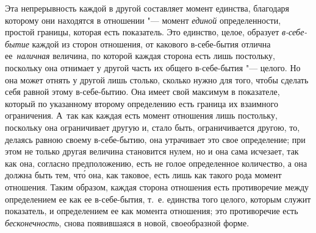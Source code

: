 Эта непрерывность каждой в другой составляет момент единства, благодаря
которому они находятся в отношении "--- момент {\em единой} определенности,
простой границы, которая есть показатель. Это единство, целое, образует
{\em в-себе-бытие} каждой из сторон отношения, от какового в-себе-бытия отлична
ее~{\em наличная} величина, по которой каждая сторона есть лишь постольку,
поскольку она отнимает у другой часть их общего в-себе-бытия "--- целого. Но
она может отнять у другой лишь столько, сколько нужно для того, чтобы сделать
себя равной этому в-себе-бытию. Она имеет свой максимум в показателе, который
по указанному второму определению есть граница их взаимного ограничения. А~так
как каждая есть момент отношения лишь постольку, поскольку она ограничивает
другую и, стало быть, ограничивается другою, то, делаясь равною своему
в-себе-бытию, она утрачивает это свое определение; при этом не только другая
величина становится нулем, но и она сама
исчезает, так как она, согласно предположению, есть не голое определенное
количество, а она должна быть тем, чт\'{о} она, как таковое, есть лишь как
такого рода момент отношения. Таким образом, каждая сторона отношения есть
противоречие между определением ее как ее в-себе-бытия, т.~е. единства того
целого, которым служит показатель, и определением ее как момента отношения; это
противоречие есть {\em бесконечность}, снова появившаяся в новой, своеобразной
форме.

